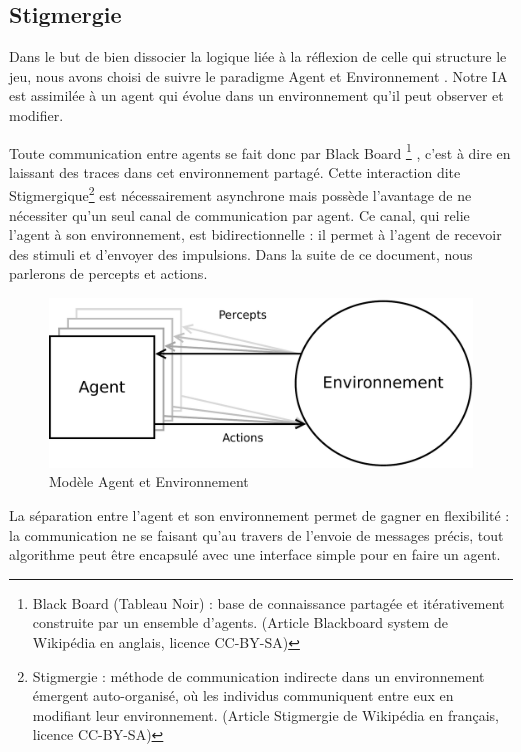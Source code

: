 \subsection{ \og Stigmergie \fg{} }

Dans le but de bien dissocier la logique liée à la réflexion de celle qui structure le jeu, nous avons choisi de suivre le paradigme \og Agent et Environnement \fg{}. Notre IA est assimilée à un agent qui évolue dans un environnement qu'il peut observer et modifier.

Toute communication entre agents se fait donc par \og Black Board \footnote{ \og Black Board \fg{} (Tableau Noir) : base de connaissance partagée et itérativement construite par un ensemble d'agents. (Article \og Blackboard system \fg{} de Wikipédia en anglais, licence CC-BY-SA)} \fg{}, c'est à dire en laissant des traces dans cet environnement partagé. Cette interaction dite \og Stigmergique\footnote{\og Stigmergie \fg{} : méthode de communication indirecte dans un environnement émergent auto-organisé, où les individus communiquent entre eux en modifiant leur environnement. (Article \og Stigmergie \fg{} de Wikipédia en français, licence CC-BY-SA)} \fg{} est nécessairement asynchrone mais possède l'avantage de ne nécessiter qu'un seul canal de communication par agent. Ce canal, qui relie l'agent à son environnement, est bidirectionnelle : il permet à l'agent de recevoir des stimuli et d'envoyer des impulsions. Dans la suite de ce document, nous parlerons de \og percepts\fg{} et \og actions\fg{}.

\begin{figure}[H] 
\centering
\includegraphics[width=\textwidth]{files/env/agent_env} 
\caption{Modèle \og Agent et Environnement \fg{}} 
\label{agent_env}
\end{figure}

La séparation entre l'agent et son environnement permet de gagner en flexibilité : la communication ne se faisant qu'au travers de l'envoie de messages précis, tout algorithme peut être encapsulé avec une interface simple pour en faire un agent.

